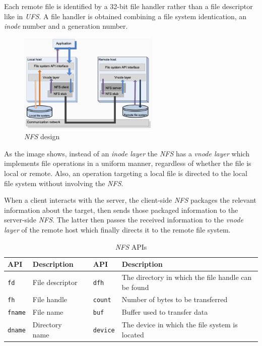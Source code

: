 Each remote file is identified by a 32-bit file handler rather than a file
descriptor like in \emph{UFS}. A file handler is obtained combining a file
system identication, an \emph{inode} number and a generation number.

\begin{figure}[h!]
    \centering
    \includegraphics[width=0.6\textwidth]{images/nfs-design.png}
    \caption{\emph{NFS} design}
\end{figure}

\noindent
As the image shows, instead of an \emph{inode layer} the \emph{NFS} has a
\emph{vnode layer} which implements file operations in a uniform manner,
regardless of whether the file is local or remote. Also, an operation targeting
a local file is directed to the local file system without involving the \emph{NFS}.

When a client interacts with the server, the client-side \emph{NFS} packages the
relevant information about the target, then sends those packaged information to
the server-side \emph{NFS}. The latter then passes the received information to the
\emph{vnode layer} of the remote host which finally directs it to the remote
file system.

\newpage
\begin{table}[ht!]
    \centering
    \begin{tabular}{|l|l|c|l|p{}|}
        \hline
        \textbf{API} & \textbf{Description} && \textbf{API} & \textbf{Description}\\
        \hline
        \texttt{fd} & File descriptor && \texttt{dfh} & The directory in which the file
        handle can be found\\
        \hline
        \texttt{fh} & File handle && \texttt{count} & Number of bytes to be transferred\\
        \hline
        \texttt{fname} & File name && \texttt{buf} & Buffer used to transfer data\\
        \hline
        \texttt{dname} & Directory name && \texttt{device} & The device in which the
        file system is located\\
        \hline
    \end{tabular}
    \caption{\emph{NFS} APIs}
\end{table}

